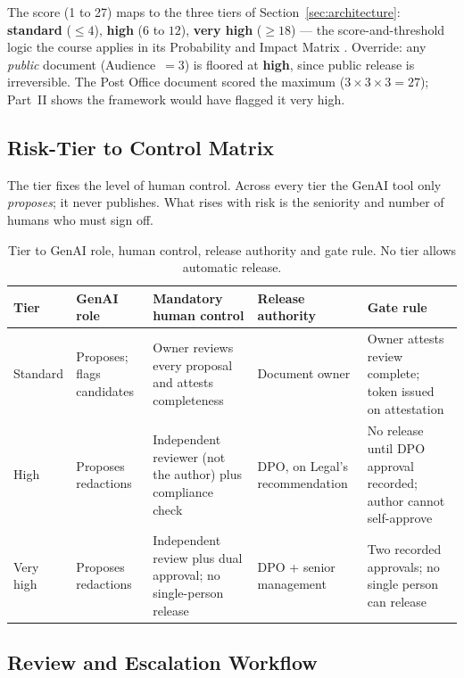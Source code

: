 \documentclass[12pt,a4paper]{article}
\begin{document}
The score (1 to 27) maps to the three tiers of Section~\ref{sec:architecture}: \textbf{standard} ($\leq 4$), \textbf{high} ($6$ to $12$), \textbf{very high} ($\geq 18$) --- the score-and-threshold logic the course applies in its Probability and Impact Matrix \cite{falchi_slides}. Override: any \emph{public} document (Audience~$=3$) is floored at \textbf{high}, since public release is irreversible. The Post Office document scored the maximum ($3\times3\times3=27$); Part~II shows the framework would have flagged it very high.

\subsection{Risk-Tier to Control Matrix}

The tier fixes the level of human control. Across every tier the GenAI tool only \emph{proposes}; it never publishes. What rises with risk is the seniority and number of humans who must sign off.

\begin{table}[H]
\centering
\footnotesize
{}
\begin{tabular}{@{} p{1.3cm} p{2.4cm} p{3.2cm} p{2.5cm} p{3.3cm} @{}}
\toprule
\textbf{\color{accentdark}Tier} & \textbf{\color{accentdark}GenAI role} & \textbf{\color{accentdark}Mandatory human control} & \textbf{\color{accentdark}Release authority} & \textbf{\color{accentdark}Gate rule} \\
\midrule
Standard & Proposes; flags candidates & Owner reviews every proposal and attests completeness & Document owner & Owner attests review complete; token issued on attestation \\
High & Proposes redactions & Independent reviewer (not the author) plus compliance check & DPO, on Legal's recommendation & No release until DPO approval recorded; author cannot self-approve \\
Very high & Proposes redactions & Independent review plus dual approval; no single-person release & DPO + senior management & Two recorded approvals; no single person can release \\
\bottomrule
\end{tabular}
\caption{Tier to GenAI role, human control, release authority and gate rule. No tier allows automatic release.}
\label{tab:risktier}
\end{table}

\subsection{Review and Escalation Workflow}
\end{document}
